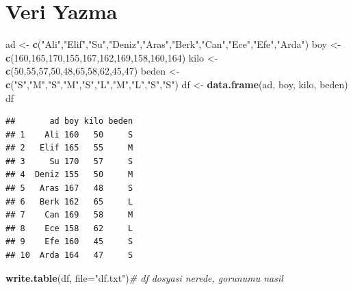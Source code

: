 \documentclass[
  oneside]{book}
\newenvironment{Shaded}{\begin{snugshade}}{\end{snugshade}}
\newcommand{\AttributeTok}[1]{\textcolor[rgb]{0.13,0.29,0.53}{#1}}
\newcommand{\CommentTok}[1]{\textcolor[rgb]{0.56,0.35,0.01}{\textit{#1}}}
\newcommand{\DecValTok}[1]{\textcolor[rgb]{0.00,0.00,0.81}{#1}}
\newcommand{\FunctionTok}[1]{\textcolor[rgb]{0.13,0.29,0.53}{\textbf{#1}}}
\newcommand{\NormalTok}[1]{#1}
\newcommand{\OtherTok}[1]{\textcolor[rgb]{0.56,0.35,0.01}{#1}}
\newcommand{\StringTok}[1]{\textcolor[rgb]{0.31,0.60,0.02}{#1}}
\begin{document}
\hypertarget{veri-yazma}{%
\section{Veri Yazma}\label{veri-yazma}}

\begin{Shaded}
\begin{Highlighting}[]
\NormalTok{ad  }\OtherTok{\textless{}{-}}  \FunctionTok{c}\NormalTok{(}\StringTok{"Ali"}\NormalTok{,}\StringTok{"Elif"}\NormalTok{,}\StringTok{"Su"}\NormalTok{,}\StringTok{"Deniz"}\NormalTok{,}\StringTok{"Aras"}\NormalTok{,}\StringTok{"Berk"}\NormalTok{,}\StringTok{"Can"}\NormalTok{,}\StringTok{"Ece"}\NormalTok{,}\StringTok{"Efe"}\NormalTok{,}\StringTok{"Arda"}\NormalTok{)}
\NormalTok{boy }\OtherTok{\textless{}{-}} \FunctionTok{c}\NormalTok{(}\DecValTok{160}\NormalTok{,}\DecValTok{165}\NormalTok{,}\DecValTok{170}\NormalTok{,}\DecValTok{155}\NormalTok{,}\DecValTok{167}\NormalTok{,}\DecValTok{162}\NormalTok{,}\DecValTok{169}\NormalTok{,}\DecValTok{158}\NormalTok{,}\DecValTok{160}\NormalTok{,}\DecValTok{164}\NormalTok{)}
\NormalTok{kilo }\OtherTok{\textless{}{-}} \FunctionTok{c}\NormalTok{(}\DecValTok{50}\NormalTok{,}\DecValTok{55}\NormalTok{,}\DecValTok{57}\NormalTok{,}\DecValTok{50}\NormalTok{,}\DecValTok{48}\NormalTok{,}\DecValTok{65}\NormalTok{,}\DecValTok{58}\NormalTok{,}\DecValTok{62}\NormalTok{,}\DecValTok{45}\NormalTok{,}\DecValTok{47}\NormalTok{)}
\NormalTok{beden }\OtherTok{\textless{}{-}} \FunctionTok{c}\NormalTok{(}\StringTok{"S"}\NormalTok{,}\StringTok{"M"}\NormalTok{,}\StringTok{"S"}\NormalTok{,}\StringTok{"M"}\NormalTok{,}\StringTok{"S"}\NormalTok{,}\StringTok{"L"}\NormalTok{,}\StringTok{"M"}\NormalTok{,}\StringTok{"L"}\NormalTok{,}\StringTok{"S"}\NormalTok{,}\StringTok{"S"}\NormalTok{)}
\NormalTok{df }\OtherTok{\textless{}{-}} \FunctionTok{data.frame}\NormalTok{(ad, boy, kilo, beden)}
\NormalTok{df}
\end{Highlighting}
\end{Shaded}

\begin{verbatim}
##       ad boy kilo beden
## 1    Ali 160   50     S
## 2   Elif 165   55     M
## 3     Su 170   57     S
## 4  Deniz 155   50     M
## 5   Aras 167   48     S
## 6   Berk 162   65     L
## 7    Can 169   58     M
## 8    Ece 158   62     L
## 9    Efe 160   45     S
## 10  Arda 164   47     S
\end{verbatim}

\begin{Shaded}
\begin{Highlighting}[]
\FunctionTok{write.table}\NormalTok{(df, }\AttributeTok{file=}\StringTok{"df.txt"}\NormalTok{)}\CommentTok{\# df dosyasi nerede, gorunumu nasil}
\end{Highlighting}
\end{Shaded}
\end{document}
